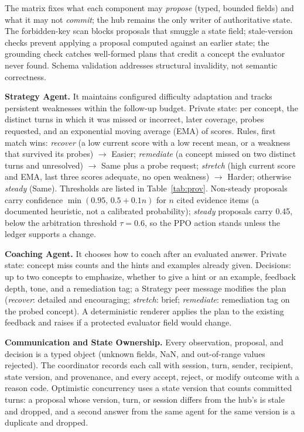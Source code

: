 \documentclass[runningheads,a4paper]{llncs}
\begin{document}
The matrix fixes what each component may \emph{propose} (typed, bounded fields) and what it may not \emph{commit}; the hub remains the only writer of authoritative state. The forbidden-key scan blocks proposals that smuggle a state field; stale-version checks prevent applying a proposal computed against an earlier state; the grounding check catches well-formed plans that credit a concept the evaluator never found. Schema validation addresses structural invalidity, not semantic correctness.

\textbf{Strategy Agent.} It maintains configured difficulty adaptation and tracks persistent weaknesses within the follow-up budget. Private state: per concept, the distinct turns in which it was missed or incorrect, later coverage, probes requested, and an exponential moving average (EMA) of scores. Rules, first match wins: \emph{recover} (a low current score with a low recent mean, or a weakness that survived its probes) $\to$ Easier; \emph{remediate} (a concept missed on two distinct turns and unresolved) $\to$ Same plus a probe request; \emph{stretch} (high current score and EMA, last three scores adequate, no open weakness) $\to$ Harder; otherwise \emph{steady} (Same). Thresholds are listed in Table~\ref{tab:prov}. Non-steady proposals carry confidence $\min(0.95,\,0.5+0.1n)$ for $n$ cited evidence items (a documented heuristic, not a calibrated probability); \emph{steady} proposals carry 0.45, below the arbitration threshold $\tau=0.6$, so the PPO action stands unless the ledger supports a change.

\textbf{Coaching Agent.} It chooses how to coach after an evaluated answer. Private state: concept miss counts and the hints and examples already given. Decisions: up to two concepts to emphasize, whether to give a hint or an example, feedback depth, tone, and a remediation tag; a Strategy peer message modifies the plan (\emph{recover}: detailed and encouraging; \emph{stretch}: brief; \emph{remediate}: remediation tag on the probed concept). A deterministic renderer applies the plan to the existing feedback and raises if a protected evaluator field would change.

\textbf{Communication and State Ownership.} Every observation, proposal, and decision is a typed object (unknown fields, NaN, and out-of-range values rejected). The coordinator records each call with session, turn, sender, recipient, state version, and provenance, and every accept, reject, or modify outcome with a reason code. Optimistic concurrency uses a state version that counts committed turns: a proposal whose version, turn, or session differs from the hub's is stale and dropped, and a second answer from the same agent for the same version is a duplicate and dropped.
\end{document}

